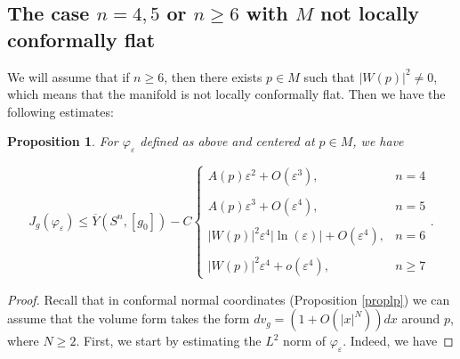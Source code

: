 \documentclass[11pt]{article}
\newtheorem{proposition}{Proposition}[section]
\begin{document}
{\subsection{\texorpdfstring{The case $n=4,5$ or $n\geq 6$ with $M$ not locally conformally flat}{The case n=4,5 or n greater than 6 with M not locally conformally flat}}
We will assume that if $n\geq 6$, then there exists $p\in M$ such that $|W(p)|^{2}\not=0$, which means that the manifold is not locally conformally flat. Then we have the following estimates:
\begin{proposition}\label{lemma 2 exp}
For $\varphi_{\varepsilon}$ defined as above and centered at $p\in M$, we have 

\begin{equation}\label{eqj}
J_{g}(\varphi_{\varepsilon})\leq \overline{Y}(S^{n},[g_{0}])-C\left\{\begin{array}{lll}
A(p)\varepsilon^{2} +O(\varepsilon^{3}), & n=4\\
\\
A(p)\varepsilon^{3}+O(\varepsilon^{4}), & n=5\\
\\
|W(p)|^{2}\varepsilon^{4}|\ln(\varepsilon)|+O(\varepsilon^{4}), & n=6\\
\\
|W(p)|^{2}\varepsilon^{4}+o(\varepsilon^{4}), & n\geq 7
\end{array}
\right. .
\end{equation}
\end{proposition}

\begin{proof}
Recall  that in conformal normal coordinates (Proposition \ref{proplp}) we can assume that the volume form takes the form $dv_{g}=(1+O(|x|^{N}))dx$ around $p$, where $N\geq 2$. First, we start by estimating the $L^{2}$ norm of $\varphi_{\varepsilon}$. Indeed, we have


\end{proof}}
\end{document}
